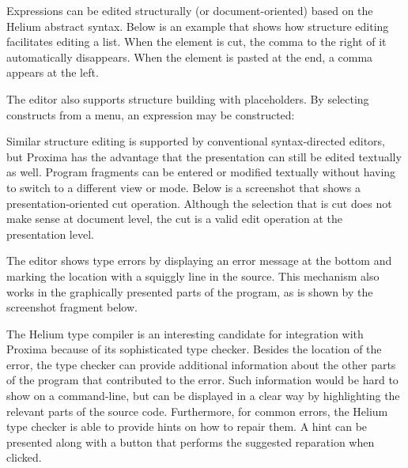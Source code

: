 
Expressions can be edited structurally (or document-oriented) based on the Helium abstract syntax. Below is an example that shows how structure editing facilitates editing a list. When the  element is cut, the comma to the right of it automatically disappears. When the element is pasted at the end, a comma appears at the left. 


 \then 
{} \then 
{} 

The editor also supports structure building with placeholders. By selecting constructs from a menu, an expression may be constructed:

 \then
{} \then
{} 


Similar structure editing is supported by conventional syntax-directed editors, but Proxima has the advantage that the presentation can still be edited textually as well. Program fragments can be entered or modified textually without having to switch to a different view or mode.  Below is a screenshot that shows a presentation-oriented cut operation. Although the selection that is cut does not make sense at document level, the cut is a valid edit operation at the presentation level.

 \then
{}



The editor shows type errors by displaying an error message at the bottom and marking the location with a squiggly line in the source. This mechanism also works in the graphically presented parts of the program, as is shown by the screenshot fragment below.


The Helium type compiler is an interesting candidate for integration with Proxima because of its sophisticated type checker. Besides the location of the error, the type checker can provide additional information about the other parts of the program that contributed to the error. Such information would be hard to show on a command-line, but can be displayed in a clear way by highlighting the relevant parts of the source code. Furthermore, for common errors, the Helium type checker is able to provide hints on how to repair them. A hint can be presented along with a button that performs the suggested reparation when clicked.


